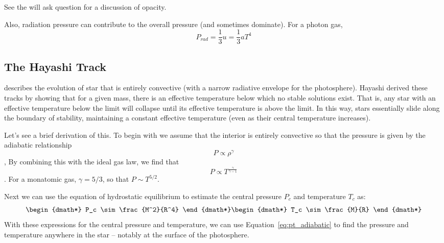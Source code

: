 See the will ask question for a discussion of opacity.

Also, radiation pressure can contribute to the overall pressure (and sometimes dominate).  
For a photon gas,
\begin{equation}
P_{rad}=\frac{1}{3}u=\frac{1}{3}aT^4
\end{equation}

\subsection{The Hayashi Track}
describes the evolution of star that is entirely convective
(with a narrow radiative envelope for the photosphere).
Hayashi derived these tracks by showing that for
a given mass, there is an effective temperature below which no stable solutions exist.
That is, any star with an effective temperature below the limit will collapse until its
effective temperature is above the limit.  In this way, stars essentially slide along
the boundary of stability, maintaining a constant effective temperature
(even as their central temperature increases).

Let's see a brief derivation of this.  To begin with we assume that the interior is entirely
convective so that the pressure is given by the adiabatic relationship
\begin{dmath}
    P\propto\rho^\gamma
\end{dmath},
By combining this with the ideal gas law, we find that
\begin{dmath}\label{eq:pt_adiabatic}
    P\propto T^{\frac{\gamma}{\gamma-1}}
\end{dmath}.
For a monatomic gas, $\gamma=5/3$, so that $P\sim T^{5/2}$.

Next we can use the equation of hydrostatic equilibrium to estimate the central pressure $P_c$ and
temperature $T_c$ as:
\begin{dgroup*}
\begin{dmath*}
    P_c \sim \frac{M^2}{R^4}
\end{dmath*}
\begin{dmath*}
    T_c \sim \frac{M}{R}
\end{dmath*}
\end{dgroup*}
With these expressions for the central pressure and temperature, we can use
Equation~\ref{eq:pt_adiabatic} to find the pressure and temperature anywhere in the
star -- notably at the surface of the photosphere.

